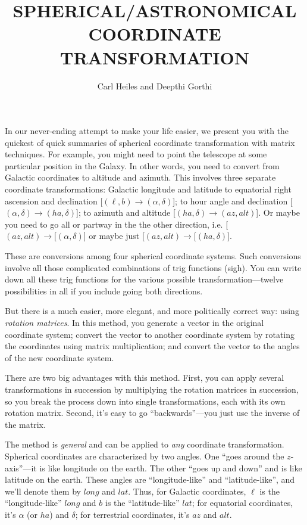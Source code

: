 \documentclass[]{article}
\begin{document}
\title{SPHERICAL/ASTRONOMICAL COORDINATE TRANSFORMATION}
\author{Carl Heiles and Deepthi Gorthi}

\maketitle

    In our never-ending attempt to make your life easier, we present
you with the quickest of quick summaries of spherical coordinate
transformation with matrix techniques.  For example, you might need to
point the telescope at some particular position in the Galaxy.  In other
words, you need to convert from Galactic coordinates to altitude and
azimuth.  This involves three separate coordinate transformations:
Galactic longitude and latitude to equatorial right ascension and
declination [$(\ell, b) \rightarrow (\alpha, \delta)$]; to hour angle
and declination [$(\alpha, \delta) \rightarrow (ha, \delta)$]; to
azimuth and altitude [$(ha, \delta) \rightarrow (az, alt)$].  Or maybe
you need to go all or partway in the the other direction, i.e.  [$(az,
alt) \rightarrow [(\alpha, \delta)$] or maybe just [$(az, alt)
\rightarrow [(ha, \delta)$]. 

    These are conversions among four spherical coordinate systems. 
Such conversions involve all those complicated combinations of trig
functions (sigh).  You can write down all these trig functions for the
various possible transformation---twelve possibilities in all if you
include going both directions. 

    But there is a much easier, more elegant, and more politically
correct way: using {\it rotation matrices}.   In this method, you
generate a vector in the original coordinate system; convert the vector
to another coordinate system by rotating the coordinates using matrix
multiplication; and convert the vector to the angles of the new
coordinate system.  

    There are two big advantages with this method.  First, you can
apply several transformations in succession by multiplying the rotation
matrices in succession, so you break the process down into single
transformations, each with its own rotation matrix.  Second, it's easy
to go ``backwards''---you just use the inverse of the matrix. 

    The method is {\it general} and can be applied to {\it any}
coordinate transformation.  Spherical coordinates are characterized by
two angles.  One ``goes around the $z$-axis''---it is like longitude on
the earth.  The other ``goes up and down'' and is like latitude on the
earth.  These angles are ``longitude-like'' and ``latitude-like'', and
we'll denote them by $long$ and $lat$.  Thus, for Galactic coordinates,
$\ell$ is the ``longitude-like'' $long$ and $b$ is the ``latitude-like''
$lat$; for equatorial coordinates, it's $\alpha$ (or $ha$) and $\delta$;
for terrestrial coordinates, it's $az$ and $alt$. 
\end{document}
